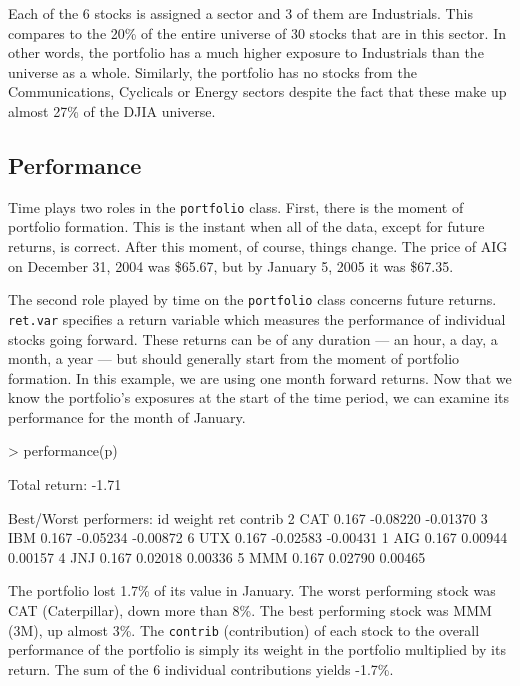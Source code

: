 \documentclass[a4paper]{report}
\begin{document}
\begin{article}
Each of the 6 stocks is assigned a sector and 3 of them are
Industrials. This compares to the 20\% of the entire universe of 30
stocks that are in this sector. In other words, the portfolio has a
much higher exposure to Industrials than the universe as a whole.
Similarly, the portfolio has no stocks from the Communications,
Cyclicals or Energy sectors despite the fact that these make up almost
27\% of the DJIA universe. 

\subsection*{Performance}

Time plays two roles in the \texttt{portfolio} class. First, there is
the moment of portfolio formation. This is the instant when all of the
data, except for future returns, is correct. After this moment, of
course, things change. The price of AIG on December 31, 2004 was
\$65.67, but by January 5, 2005 it was \$67.35.

The second role played by time on the \texttt{portfolio} class
concerns future returns. \texttt{ret.var} specifies a return variable
which measures the performance of individual stocks going forward.
These returns can be of any duration --- an hour, a day, a month, a
year --- but should generally start from the moment of portfolio
formation. In this example, we are using one month forward returns.
Now that we know the portfolio's exposures at the start of the time
period, we can examine its performance for the month of January.

\begin{Schunk}
\begin{Sinput}
> performance(p)
\end{Sinput}
\begin{Soutput}
Total return:  -1.71 %

Best/Worst performers:
   id weight      ret  contrib
2 CAT  0.167 -0.08220 -0.01370
3 IBM  0.167 -0.05234 -0.00872
6 UTX  0.167 -0.02583 -0.00431
1 AIG  0.167  0.00944  0.00157
4 JNJ  0.167  0.02018  0.00336
5 MMM  0.167  0.02790  0.00465
\end{Soutput}
\end{Schunk}

The portfolio lost 1.7\% of its value in January. The worst performing
stock was CAT (Caterpillar), down more than 8\%. The best performing
stock was MMM (3M), up almost 3\%. The \texttt{contrib} (contribution)
of each stock to the overall performance of the portfolio is simply
its weight in the portfolio multiplied by its return. The sum of the 6
individual contributions yields -1.7\%.



\end{article}
\end{document}
